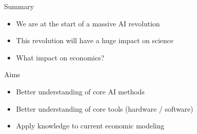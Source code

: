 \begin{frame}{Summary}

    \begin{itemize}
        \item We are at the start of a massive AI revolution
        \vspace{0.2em}
        \item This revolution will have a huge impact on science
        \vspace{0.2em}
        \item What impact on economics?
    \end{itemize}

        \vspace{0.2em}
        \vspace{0.2em}
        \vspace{0.2em}
        \vspace{0.2em}
    \pause
    Aims

        \vspace{0.2em}
    \begin{itemize}
        \item Better understanding of core AI methods
            \vspace{0.2em}
        \item Better understanding of core tools (hardware / software)
            \vspace{0.2em}
        \item Apply knowledge to current economic modeling 
    \end{itemize}

\end{frame}





